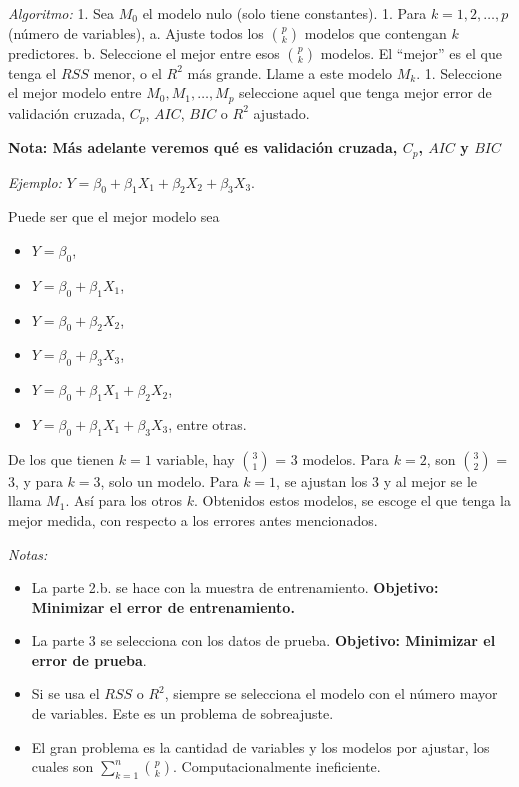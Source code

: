 \documentclass[
  12pt,
]{book}
\providecommand{\tightlist}{%
  \setlength{\itemsep}{0pt}\setlength{\parskip}{0pt}}
\theoremstyle{definition}
\theoremstyle{definition}
\theoremstyle{definition}
\theoremstyle{remark}
\begin{document}
\emph{Algoritmo:}
1. Sea \(M_0\) el modelo nulo (solo tiene constantes).
1. Para \(k=1,2,\dots,p\) (número de variables),
a. Ajuste todos los \(\binom{p}{k}\) modelos que contengan \(k\) predictores.
b. Seleccione el mejor entre esos \(\binom{p}{k}\) modelos. El ``mejor'' es el que tenga el \(RSS\) menor, o el \(R^2\) más grande. Llame a este modelo \(M_k\).
1. Seleccione el mejor modelo entre \(M_0,M_1,\dots,M_p\) seleccione aquel que tenga mejor error de validación cruzada, \(C_p\), \(AIC\), \(BIC\) o \(R^2\) ajustado.

\textbf{Nota: Más adelante veremos qué es validación cruzada, \(C_p\), \(AIC\) y \(BIC\)}

\emph{Ejemplo:} \(Y = \beta_0+\beta_1X_1+ \beta_2X_2 + \beta_3X_3\).

Puede ser que el mejor modelo sea

\begin{itemize}
\item
  \(Y = \beta_0\),
\item
  \(Y = \beta_0+\beta_1X_1\),
\item
  \(Y = \beta_0+\beta_2X_2\),
\item
  \(Y = \beta_0+\beta_3X_3\),
\item
  \(Y = \beta_0+\beta_1X_1+\beta_2X_2\),
\item
  \(Y = \beta_0+\beta_1X_1+\beta_3X_3\), entre otras.
\end{itemize}

De los que tienen \(k=1\) variable, hay \(\binom{3}{1}\) = 3 modelos. Para \(k=2\), son \(\binom{3}{2}\) = 3, y para \(k=3\), solo un modelo. Para \(k=1\), se ajustan los 3 y al mejor se le llama \(M_1\). Así para los otros \(k\). Obtenidos estos modelos, se escoge el que tenga la mejor medida, con respecto a los errores antes mencionados.

\emph{Notas:}

\begin{itemize}
\tightlist
\item
  La parte 2.b. se hace con la muestra de entrenamiento. \textbf{Objetivo: Minimizar el error de entrenamiento.}
\item
  La parte 3 se selecciona con los datos de prueba. \textbf{Objetivo: Minimizar el error de prueba}.
\item
  Si se usa el \(RSS\) o \(R^2\), siempre se selecciona el modelo con el número mayor de variables. Este es un problema de sobreajuste.
\item
  El gran problema es la cantidad de variables y los modelos por ajustar, los cuales son \(\sum_{k=1}^n \binom{p}{k}\). Computacionalmente ineficiente.
\end{itemize}
\end{document}
